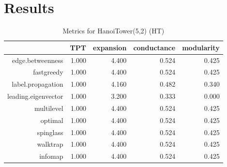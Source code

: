 \documentclass[paper=a4, fontsize=11pt]{scrartcl} %
\begin{document}
\section{Results}
\begin{table}[ht]
\centering
\begin{tabular}{rrrrr}
  \hline
 & TPT & expansion & conductance & modularity \\ 
  \hline
edge.betweenness & 1.000 & 4.400 & 0.524 & 0.425 \\ 
  
             fastgreedy & 1.000 & 4.400 & 0.524 & 0.425 \\ 
  
             label.propagation & 1.000 & 4.160 & 0.482 & 0.340 \\ 
  
             leading.eigenvector & 1.000 & 3.200 & 0.333 & 0.000 \\ 
  
             multilevel & 1.000 & 4.400 & 0.524 & 0.425 \\ 
  
             optimal & 1.000 & 4.400 & 0.524 & 0.425 \\ 
  
             spinglass & 1.000 & 4.400 & 0.524 & 0.425 \\ 
  
             walktrap & 1.000 & 4.400 & 0.524 & 0.425 \\ 
  
             infomap & 1.000 & 4.400 & 0.524 & 0.425 \\ 
   \hline
\end{tabular}
\caption{Metrics for HanoiTower(5,2) (HT)} 
\end{table}
\end{document}
